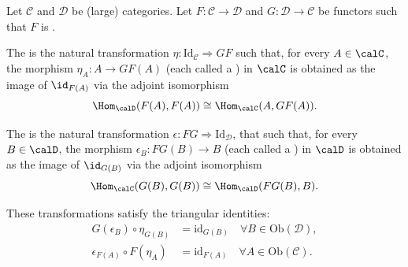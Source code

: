 \begin{definition} \label{definition:adjoint_functors_between_categories_unit_counit_of_adjoint_functors}
Let $\mathcal{C}$ and $\mathcal{D}$ be (large) categories. 
Let $F: \mathcal{C} \to \mathcal{D}$ and $G: \mathcal{D} \to \mathcal{C}$ be functors such that $F$ is .

The  is the natural transformation $\eta : \mathrm{Id}_{\mathcal{C}} \Rightarrow G F$ such that, for every $A \in \calC$, the morphism $\eta_A: A \to GF(A)$ (each called a ) in $\calC$ is obtained as the image of $\id_{F(A)}$ via the adjoint isomorphism
$$\Hom_\calD(F(A), F(A)) \cong \Hom_\calC(A, GF(A)). $$


The  is the natural transformation
$\epsilon : F G \Rightarrow \mathrm{Id}_{\mathcal{D}}$, that such that, for every $B \in \calD$, the morphism $\epsilon_B: FG(B) \to B$ (each called a ) in $\calD$ is obtained as the image of $\id_{G(B)}$ via the adjoint isomorphism 
$$\Hom_\calC(G(B), G(B)) \cong \Hom_\calD(FG(B), B).$$

These transformations satisfy the triangular identities:
\begin{align*}
G(\epsilon_B) \circ \eta_{G(B)} &= \mathrm{id}_{G(B)} \quad \forall B \in \mathrm{Ob}(\mathcal{D}), \\
\epsilon_{F(A)} \circ F(\eta_A) &= \mathrm{id}_{F(A)} \quad \forall A \in \mathrm{Ob}(\mathcal{C}).
\end{align*}
\end{definition}
